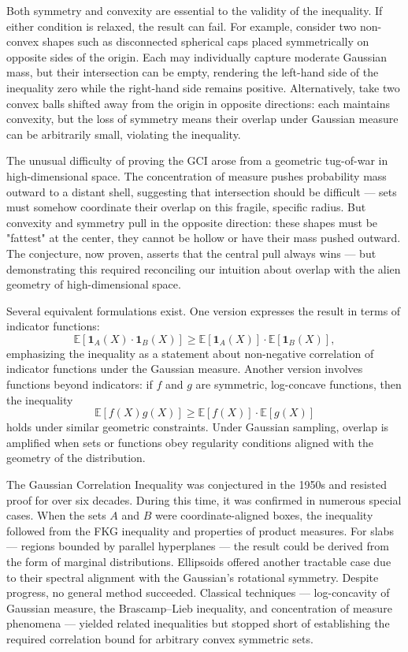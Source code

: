 Both symmetry and convexity are essential to the validity of the inequality. If either condition is relaxed, the result can fail. For example, consider two non-convex shapes such as disconnected spherical caps placed symmetrically on opposite sides of the origin. Each may individually capture moderate Gaussian mass, but their intersection can be empty, rendering the left-hand side of the inequality zero while the right-hand side remains positive. Alternatively, take two convex balls shifted away from the origin in opposite directions: each maintains convexity, but the loss of symmetry means their overlap under Gaussian measure can be arbitrarily small, violating the inequality.

The unusual difficulty of proving the GCI arose from a geometric tug-of-war in high-dimensional space. The concentration of measure pushes probability mass outward to a distant shell, suggesting that intersection should be difficult — sets must somehow coordinate their overlap on this fragile, specific radius. But convexity and symmetry pull in the opposite direction: these shapes must be "fattest" at the center, they cannot be hollow or have their mass pushed outward. The conjecture, now proven, asserts that the central pull always wins — but demonstrating this required reconciling our intuition about overlap with the alien geometry of high-dimensional space.

Several equivalent formulations exist. One version expresses the result in terms of indicator functions:
\[
\mathbb{E}[\mathbf{1}_A(X) \cdot \mathbf{1}_B(X)] \geq \mathbb{E}[\mathbf{1}_A(X)] \cdot \mathbb{E}[\mathbf{1}_B(X)],
\]
emphasizing the inequality as a statement about non-negative correlation of indicator functions under the Gaussian measure. Another version involves functions beyond indicators: if \( f \) and \( g \) are symmetric, log-concave functions, then the inequality
\[
\mathbb{E}[f(X)g(X)] \geq \mathbb{E}[f(X)] \cdot \mathbb{E}[g(X)]
\]
holds under similar geometric constraints. Under Gaussian sampling, overlap is amplified when sets or functions obey regularity conditions aligned with the geometry of the distribution.

The Gaussian Correlation Inequality was conjectured in the 1950s and resisted proof for over six decades. During this time, it was confirmed in numerous special cases. When the sets \( A \) and \( B \) were coordinate-aligned boxes, the inequality followed from the FKG inequality and properties of product measures. For slabs — regions bounded by parallel hyperplanes — the result could be derived from the form of marginal distributions. Ellipsoids offered another tractable case due to their spectral alignment with the Gaussian's rotational symmetry. Despite progress, no general method succeeded. Classical techniques — log-concavity of Gaussian measure, the Brascamp–Lieb inequality, and concentration of measure phenomena — yielded related inequalities but stopped short of establishing the required correlation bound for arbitrary convex symmetric sets.

